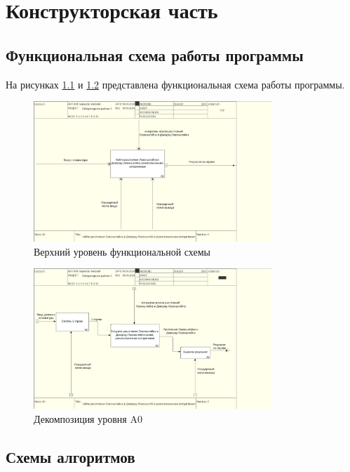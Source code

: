 \chapter{Конструкторская часть}

\section{Функциональная схема работы программы}

На рисунках \ref{fig:idef0} и \ref{fig:idef0a0} представлена функциональная схема работы программы.

\begin{figure}[h!]
	\centering
	\includegraphics[width=0.8\textwidth]{tex_parts/idef0.png}
	\caption{\label{fig:idef0}Верхний уровень функциональной схемы}
\end{figure}

\begin{figure}[h!]
	\centering
	\includegraphics[width=0.8\textwidth]{tex_parts/idef0a0.png}
	\caption{\label{fig:idef0a0}Декомпозиция уровня A0}
\end{figure}

\section{Схемы алгоритмов}

